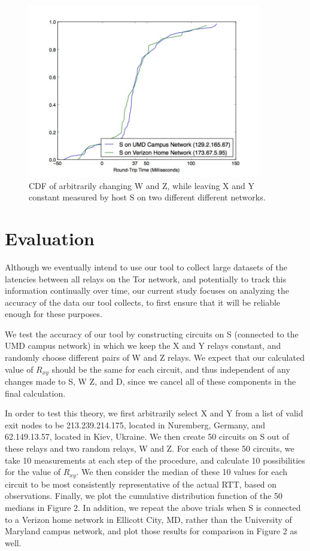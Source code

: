 \documentclass[twocolumn,11pt]{article}
\begin{document}
\newpage

\begin{figure}[t!]
\centering
\includegraphics[width=4in]{cdf}
\caption{\label{fig:myfigure} CDF of arbitrarily changing W and Z, while leaving X and Y constant measured by host S on two different different networks.}
\end{figure}
\section{Evaluation}

Although we eventually intend to use our tool to collect large datasets of the latencies between all relays on the Tor network, and potentially to track this information continually over time, our current study focuses on analyzing the accuracy of the data our tool collects, to first ensure that it will be reliable enough for these purposes.

We test the accuracy of our tool by constructing circuits on S (connected to the UMD campus network) in which we keep the X and Y relays constant, and randomly choose different pairs of W and Z relays. We expect that our calculated value of $R_{xy}$ should be the same for each circuit, and thus independent of any changes made to S, W Z, and D, since we cancel all of these components in the final calculation. 

In order to test this theory, we first arbitrarily select X and Y from a list of valid exit nodes to be 213.239.214.175, located in Nuremberg, Germany, and 62.149.13.57, located in Kiev, Ukraine. We then create 50 circuits on S out of these relays and two random relays, W and Z. For each of these 50 circuits, we take 10 measurements at each step of the procedure, and calculate 10 possibilities for the value of $R_{xy}$. We then consider the median of these 10 values for each circuit to be most consistently representative of the actual RTT, based on observations. Finally, we plot the cumulative distribution function of the 50 medians in Figure 2. In addition, we repeat the above trials when S is connected to a Verizon home network in Ellicott City, MD, rather than the University of Maryland campus network, and plot those results for comparison in Figure 2 as well. 
\end{document}

